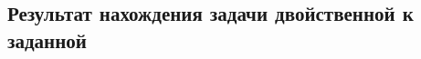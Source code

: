 \documentclass[../body.tex]{subfiles}
\begin{document}
 \subsection{Результат нахождения задачи двойственной к заданной}
	\begin{comment}
	Меняем знаки у ограничений с $\geq$, путём умножения на -1:
	\begin{equation}
			\left\{
		\begin{array}{ll} 
			x_1+2x_2+3x_3+4x_4 \ge 1\\
			2x_1+3x_2+8x_3+x_5=2\\
			x_1+4x_2+5x_4+x_5=3\\
			3x_1+7x_2+4x_3+2x_5 = 4\\
			2x_1+3x_2+5x_3+6x_4+x_5 \le 5\\
			x_1,x_2,x_3,x_4 \ge 0
		\end{array}
		\right.
		\Longrightarrow
		\left\{
		\begin{array}{ll} 
			-x_1-2x_2-3x_3-4x_4 \le -1\\
			2x_1+3x_2+8x_3+x_5=2\\
			x_1+4x_2+5x_4+x_5=3\\
			3x_1+7x_2+4x_3+2x_5 = 4\\
			2x_1+3x_2+5x_3+6x_4+x_5 \le 5\\
			x_1,x_2,x_3,x_4 \ge 0
		\end{array}
		\right.
	\end{equation}\\
	Для каждого ограничения с неравенством добавляем дополнительные переменные $x_6$ и $x_7$.
	Перепишем ограничения в каноническом виде:
	\begin{equation}
		\left\{
	\begin{array}{ll} 
		-x_1-2x_2-3x_3-4x_4\le -1\\
		2x_1+3x_2+8x_3+x_5=2\\
		x_1+4x_2+5x_4+x_5=3\\
		3x_1+7x_2+4x_3+2x_5 = 4\\
		2x_1+3x_2+5x_3+6x_4+x_5 \le 5\\
		x_1,x_2,x_3,x_4 \ge 0
	\end{array}
	\right.
		\Longrightarrow
		\left\{
			\begin{array}{ll} 
			-x_1-2x_2-3x_3-4x_4+x_{6} = -1\\
			2x_1+3x_2+8x_3+x_5=2\\
			x_1+4x_2+5x_4+x_5=3\\
			3x_1+7x_2+4x_3+2x_5 = 4\\
			2x_1+3x_2+5x_3+6x_4+x_5 + x_{7} = 5\\
			x_1,x_2,x_3,x_4 \ge 0
		\end{array}
		\right.
	\end{equation}\\
	\end{comment}
	
\end{document}
